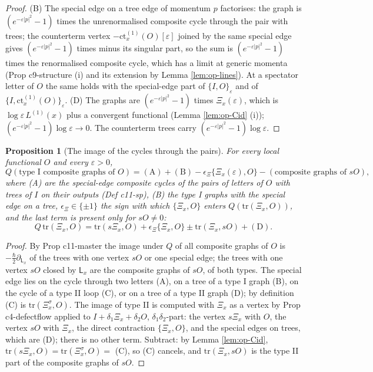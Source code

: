 \documentclass[11pt]{article}
\numberwithin{equation}{section}
\theoremstyle{plain}
\newtheorem{proposition}[theorem]{Proposition}
\theoremstyle{definition}
\newcommand{\ct}{\mathrm{ct}}
\begin{document}
\begin{proof}
(B) The special edge on a tree edge of momentum $p$ factorises: the graph is $(e^{-\varepsilon|p|^2}-1)$ times the unrenormalised composite cycle through the pair with trees; the counterterm vertex $-\ct^{(1)}_x(O)[\varepsilon]$ joined by the same special edge gives $(e^{-\varepsilon|p|^2}-1)$ times minus its singular part, so the sum is $(e^{-\varepsilon|p|^2}-1)$ times the renormalised composite cycle, which has a limit at generic momenta (Prop c9-structure (i) and its extension by Lemma \ref{lem:op-lines}). At a spectator letter of $O$ the same holds with the special-edge part of $\{I,O\}_\varepsilon$ and of $\{I,\ct^{(1)}_x(O)\}_\varepsilon$. (D) The graphs are $(e^{-\varepsilon|p|^2}-1)$ times $\Xi_x(\varepsilon)$, which is $\log\varepsilon\,L^{(1)}(x)$ plus a convergent functional (Lemma \ref{lem:op-Cid} (i)); $(e^{-\varepsilon|p|^2}-1)\log\varepsilon\to0$. The counterterm trees carry $(e^{-\varepsilon|p|^2}-1)\log\varepsilon$.
\end{proof}

\begin{proposition}[The image of the cycles through the pairs]
\label{prop:op-typeI}
For every local functional $O$ and every $\varepsilon>0$,
\[
Q(\text{type I composite graphs of }O)=(\mathrm A)+(\mathrm B)-\epsilon_\Xi\{\Xi_x(\varepsilon),O\}-(\text{composite graphs of }sO),
\]
where (A) are the special-edge composite cycles of the pairs of letters of $O$ with trees of $I$ on their outputs (Def c11-sp), (B) the type I graphs with the special edge on a tree, $\epsilon_\Xi\in\{\pm1\}$ the sign with which $\{\Xi_x,O\}$ enters $Q(\mathrm{tr}(\Xi_x,O))$, and the last term is present only for $sO\neq0$:
\[
Q\,\mathrm{tr}(\Xi_x,O)=\mathrm{tr}(s\Xi_x,O)+\epsilon_\Xi\{\Xi_x,O\}\pm\mathrm{tr}(\Xi_x,sO)+(\mathrm D).
\]
\end{proposition}

\begin{proof}
By Prop c11-master the image under $Q$ of all composite graphs of $O$ is $-\tfrac\hbar2\partial_{\mathsf L_x}$ of the trees with one vertex $sO$ or one special edge; the trees with one vertex $sO$ closed by $\mathsf L_x$ are the composite graphs of $sO$, of both types. The special edge lies on the cycle through two letters (A), on a tree of a type I graph (B), on the cycle of a type II loop (C), or on a tree of a type II graph (D); by definition (C) is $\mathrm{tr}(\Xi^\sigma_x,O)$. The image of type II is computed with $\Xi_x$ as a vertex by Prop c4-defectflow applied to $I+\delta_1\Xi_x+\delta_2O$, $\delta_1\delta_2$-part: the vertex $s\Xi_x$ with $O$, the vertex $sO$ with $\Xi_x$, the direct contraction $\{\Xi_x,O\}$, and the special edges on trees, which are (D); there is no other term. Subtract: by Lemma \ref{lem:op-Cid}, $\mathrm{tr}(s\Xi_x,O)=\mathrm{tr}(\Xi^\sigma_x,O)=$ (C), so (C) cancels, and $\mathrm{tr}(\Xi_x,sO)$ is the type II part of the composite graphs of $sO$.
\end{proof}
\end{document}
